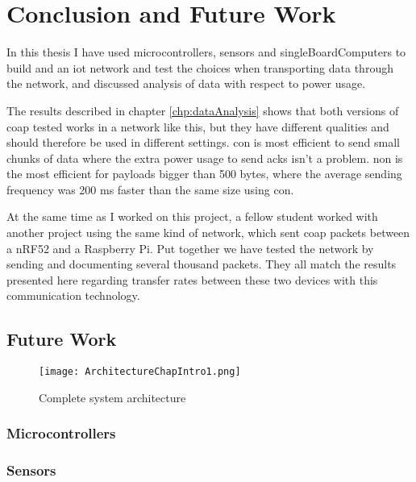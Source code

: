 \chapter{Conclusion and Future Work}
\label{chp:results}



In this thesis I have used \glspl{microcontroller}, sensors and \glspl{singleBoardComputer} to build and an \gls{iot} network and test the choices when transporting data through the network, and discussed analysis of data with respect to power usage. 

The results described in chapter \ref{chp:dataAnalysis} shows that both versions of \gls{coap} tested works in a network like this, but they have different qualities and should therefore be used in different settings. \gls{con} is most efficient to send small chunks of data where the extra power usage to send \glspl{ack} isn't a problem. \gls{non} is the most efficient for payloads bigger than 500 bytes, where the average sending frequency was 200 ms faster than the same size using \gls{con}.  


At the same time as I worked on this project, a fellow student worked with another project using the same kind of network, which sent \gls{coap} packets between a \gls{nRF52} and a \gls{Raspberry Pi}. Put together we have tested the network by sending and documenting several thousand packets. They all match the results presented here regarding transfer rates between these two devices with this communication technology.

\section{Future Work}

\begin{figure}[ht]
    \centering
    \texttt{[image: ArchitectureChapIntro1.png]}    
    \caption{Complete system architecture}
    \label{fig:systemArchitecture}
\end{figure}

\subsection{Microcontrollers}

\subsection{Sensors}

